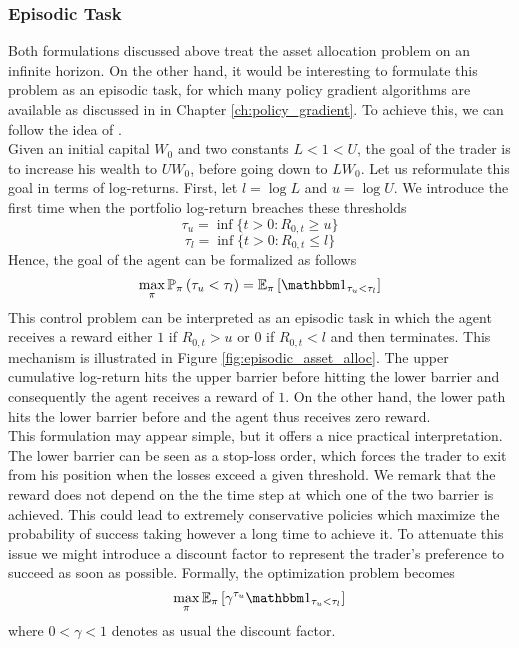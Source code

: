 \subsubsection{Episodic Task}
Both formulations discussed above treat the asset allocation problem on an infinite horizon. On the other hand, it would be interesting to formulate this problem as an episodic task, for which many policy gradient algorithms are available as discussed in  in Chapter \ref{ch:policy_gradient}. To achieve this, we can follow the idea of \cite{browne1995optimal}.\\
Given an initial capital $W_0$ and two constants $L < 1 < U$, the goal of the trader is to increase his wealth to $U W_0$, before going down to $L W_0$. Let us reformulate this goal in terms of log-returns. First, let $l = \log L$ and $u = \log U$. We introduce the first time when the portfolio log-return breaches these thresholds 
\begin{equation}
	\tau_u = \inf\{t > 0: R_{0,t} \geq u\}
\end{equation}
\begin{equation}
	\tau_l = \inf\{t > 0: R_{0,t} \leq l\}
\end{equation}
Hence, the goal of the agent can be formalized as follows 
\begin{equation}
	\max_\pi \P[\pi]{\tau_u < \tau_l} = \E[\pi]{\ind{\tau_u < \tau_l}}
\end{equation}
This control problem can be interpreted as an episodic task in which the agent receives a reward either $1$ if $R_{0,t} > u$ or $0$ if $R_{0,t} < l$ and then terminates. This mechanism is illustrated in Figure \ref{fig:episodic_asset_alloc}. The upper cumulative log-return hits the upper barrier before hitting the lower barrier and consequently the agent receives a reward of $1$. On the other hand, the lower path hits the lower barrier before and the agent thus receives zero reward.\\
This formulation may appear simple, but it offers a nice practical interpretation. The lower barrier can be seen as a stop-loss order, which forces the trader to exit from his position when the losses exceed a given threshold. We remark that the reward does not depend on the the time step at which one of the two barrier is achieved. This could lead to extremely conservative policies which maximize the probability of success taking however a long time to achieve it. To attenuate this issue we might introduce a discount factor to represent the trader's preference to succeed as soon as possible. Formally, the optimization problem becomes  
\begin{equation}
	\max_\pi \E[\pi]{\gamma^{\tau_u} \ind{\tau_u < \tau_l}}
\end{equation}
where $0 < \gamma < 1$ denotes as usual the discount factor. 

